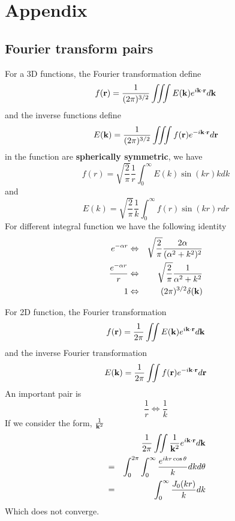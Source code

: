 \chapter{Appendix}

\section{Fourier transform pairs}
For a 3D functions, the Fourier transformation define
\begin{equation}
   f(\mathbf{r}) = \frac{1}{(2\pi)^{3/2}} \iiint E(\mathbf{k}) e^{i \mathbf{k} \cdot \mathbf{r}} d\mathbf{k} \label{A-1}
\end{equation}
and the inverse functions define
\begin{equation}
    E(\mathbf{k}) = \frac{1}{(2\pi)^{3/2}}  \iiint f(\mathbf{r}) e^{-i\mathbf{k} \cdot \mathbf{r}} d\mathbf{r} \label{A-2}
\end{equation}
in the function are \textbf{spherically symmetric}, we have
\begin{equation}
    f(r) = \sqrt{ \frac{2}{\pi} } \frac{1}{r} \int_0^\infty E(k) \sin(kr) k d k \label{A-3}
\end{equation}
and
\begin{equation}
    E(k) = \sqrt{ \frac{2}{\pi} } \frac{1}{k} \int_0^\infty f(r) \sin(kr) r dr  \label{A-4}
\end{equation}
For different integral function we have the following identity
\begin{eqnarray}
    e^{-\alpha r}  &\Leftrightarrow& \sqrt{ \frac{2}{\pi} } \frac{2\alpha}{(\alpha^2 + k^2)^2} \label{A-5} \\
\frac{e^{-\alpha r}}{r} &\Leftrightarrow& \sqrt{ \frac{2}{\pi} } \frac{1}{\alpha^2 + k^2} \label{A-6} \\
    1 &\Leftrightarrow& (2\pi)^{3/2} \delta(\mathbf{k}) \label{A-7}
\end{eqnarray}

For 2D function, the Fourier transformation
\begin{equation}
    f(\mathbf{r}) = \frac{1}{2\pi} \iint E(\mathbf{k}) e^{i\mathbf{k} \cdot \mathbf{r}} d\mathbf{k}  \label{A-8}
\end{equation}
and the inverse Fourier transformation
\begin{equation}
    E(\mathbf{k}) = \frac{1}{2\pi} \iint f(\mathbf{r}) e^{-i \mathbf{k} \cdot \mathbf{r}} d\mathbf{r} \label{A-9}
\end{equation}
An important pair is
\begin{equation}
    \frac{1}{r} \Leftrightarrow \frac{1}{k} \label{A-10}
\end{equation}
If we consider the form, $ \frac{1}{\mathbf{k}^2}$
\begin{eqnarray}
    && \frac{1}{2\pi}   \iint \frac{1}{\mathbf{k}^2} e^{i \mathbf{k} \cdot \mathbf{r}} d\mathbf{k} \nonumber \\
    &=& \int_0^{2\pi} \int_0^\infty \frac{e^{ikr \cos\theta}}{k} dk d\theta \nonumber \\
    &=& \int_0^\infty \frac{J_0(kr)}{k} dk
\end{eqnarray}
Which does not converge.
